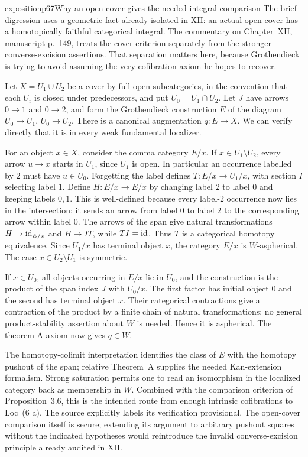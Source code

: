 \begin{dcomment}{exposition}{p67}{Why an open cover gives the needed integral comparison}
The brief digression uses a geometric fact already isolated in XII: an actual open cover has a homotopically faithful categorical integral. The commentary on Chapter~XII, manuscript p.~149, treats the cover criterion separately from the stronger converse-excision assertions. That separation matters here, because Grothendieck is trying to avoid assuming the very cofibration axiom he hopes to recover.

Let $X=U_1\cup U_2$ be a cover by full open subcategories, in the convention that each $U_i$ is closed under predecessors, and put $U_0=U_1\cap U_2$. Let $J$ have arrows $0\to1$ and $0\to2$, and form the Grothendieck construction $E$ of the diagram $U_0\to U_1$, $U_0\to U_2$. There is a canonical augmentation $q:E\to X$. We can verify directly that it is in every weak fundamental localizer.

For an object $x\in X$, consider the comma category $E/x$. If $x\in U_1\setminus U_2$, every arrow $u\to x$ starts in $U_1$, since $U_1$ is open. In particular an occurrence labelled by $2$ must have $u\in U_0$. Forgetting the label defines $T:E/x\to U_1/x$, with section $I$ selecting label $1$. Define $H:E/x\to E/x$ by changing label $2$ to label $0$ and keeping labels $0,1$. This is well-defined because every label-$2$ occurrence now lies in the intersection; it sends an arrow from label $0$ to label $2$ to the corresponding arrow within label $0$. The arrows of the span give natural transformations $H\to\mathrm{id}_{E/x}$ and $H\to IT$, while $TI=\mathrm{id}$. Thus $T$ is a categorical homotopy equivalence. Since $U_1/x$ has terminal object $x$, the category $E/x$ is $W$-aspherical. The case $x\in U_2\setminus U_1$ is symmetric.

If $x\in U_0$, all objects occurring in $E/x$ lie in $U_0$, and the construction is the product of the span index $J$ with $U_0/x$. The first factor has initial object $0$ and the second has terminal object $x$. Their categorical contractions give a contraction of the product by a finite chain of natural transformations; no general product-stability assertion about $W$ is needed. Hence it is aspherical. The theorem-A axiom now gives $q\in W$.

The homotopy-colimit interpretation identifies the class of $E$ with the homotopy pushout of the span; relative Theorem~A supplies the needed Kan-extension formalism. Strong saturation permits one to read an isomorphism in the localized category back as membership in $W$. Combined with the comparison criterion of Proposition~3.6, this is the intended route from enough intrinsic cofibrations to Loc~(6 a). The source explicitly labels its verification provisional. The open-cover comparison itself is secure; extending its argument to arbitrary pushout squares without the indicated hypotheses would reintroduce the invalid converse-excision principle already audited in XII.
\end{dcomment}


